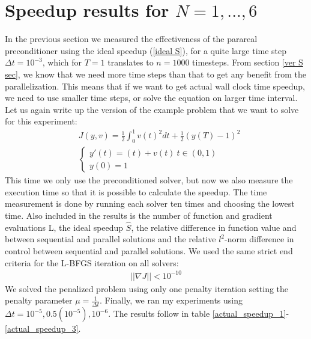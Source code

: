 \section{Speedup results for $N=1,...,6$}
In the previous section we measured the effectiveness of the parareal preconditioner using the ideal speedup (\ref{ideal S}), for a quite large time step $\Delta t =10^{-3}$, which for $T=1$ translates to $n=1000$ timesteps. From section \ref{ver S sec}, we know that we need more time steps than that to get any benefit from the parallelization. This means that if we want to get actual wall clock time speedup, we need to use smaller time steps, or solve the equation on larger time interval. Let us again write up the version of the example problem that we want to solve for this experiment:
\begin{align*}
&J(y,v) = \frac{1}{2}\int_0^1v(t)^2dt + \frac{1}{2}(y(T)-1)^2 \\
&\left\{
     \begin{array}{lr}
       	y'(t)=(t) + v(t) \ t\in(0,1)\\
       	y(0)=1
     \end{array}
   \right. 
\end{align*}
This time we only use the preconditioned solver, but now we also measure the execution time so that it is possible to calculate the speedup. The time measurement is done by running each solver ten times and choosing the lowest time. Also included in the results is the number of function and gradient evaluations L, the ideal speedup $\hat S$, the relative difference in function value and between sequential and parallel solutions and the relative $l^2$-norm difference in control between sequential and parallel solutions. We used the same strict end criteria for the L-BFGS iteration on all solvers:
\begin{align*}
||\nabla J||<10^{-10}
\end{align*}
We solved the penalized problem using only one penalty iteration setting the penalty parameter $\mu=\frac{1}{\Delta t}$. Finally, we ran my experiments using \\$\Delta t =10^{-5}, 0.5(10^{-5}), 10^{-6}$. The results follow in table \ref{actual_speedup_1}-\ref{actual_speedup_3}.
\\
\\
